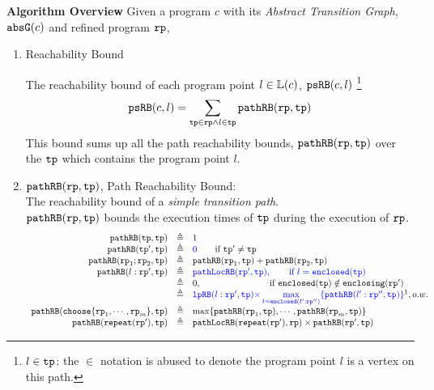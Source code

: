 \textbf{Algorithm Overview} 
Given a program $c$ with its \emph{Abstract Transition Graph}, $\mathtt{abs}{\mathtt{G}}(c)$ and refined program $\mathtt{rp}$,
\begin{enumerate}
    \item Reachability Bound
    
    The reachability bound of each program point $l \in \mathbb{L}(c)$, $\mathtt{psRB}(c, l)$
    \footnote{$l \in \mathtt{tp}$: the $\in$ notation is abused to denote
    the program point $l$ is a vertex on this path.}
   \[ 
     \mathtt{psRB}(c, l) = 
     \sum\limits_{\mathtt{tp} \in \mathtt{rp} \land 
   l \in \mathtt{tp}} 
   \mathtt{pathRB}(\mathtt{rp}, \mathtt{tp})
   \]
   This bound sums up all the path reachability bounds, $\mathtt{pathRB}(\mathtt{rp}, \mathtt{tp})$ over the $\mathtt{tp}$ which contains the program point $l$.
    \item $\mathtt{pathRB}(\mathtt{rp}, \mathtt{tp}) $, Path Reachability Bound:  
    \\
    The reachability bound of a \emph{simple transition path}.
    \\
    $\mathtt{pathRB}(\mathtt{rp}, \mathtt{tp}) $ bounds the execution times of $\mathtt{tp}$ during the execution of $\mathtt{rp}$.
%
    \[
      \begin{array}{rcl}
        \inoutB(\tpath, \tpath) & \triangleq & 1  \\
        \inoutB(\tpath', \tpath) & \triangleq & \highlight{0} \qquad \text{if } \tpath' \neq \tpath\\
        \inoutB(\rprog_1;\rprog_2, \tpath) & \triangleq & \inoutB(\rprog_1, \tpath) + \inoutB(\rprog_2, \tpath) \\
        \inoutB(l: \rprog', \tpath) & \triangleq & 
        \highlight{\outinB(\rprog', \tpath), \qquad \text{if } l = \kw{enclosed}(\tpath)}
        \\
        &  \triangleq & 
       0, \qquad \qquad \qquad \quad ~~ \text{if }  \kw{enclosed}(\tpath) \notin \kw{enclosing}(\rprog')
        \\
        &  \triangleq & 
        \highlight{
          \lpchB(l:\rprog', \tpath ) }
        \highlight{\times \max\limits_{l = \kw{enclosed}(l':\rprog'')}
       \{\inoutB(l':\rprog'', \tpath)\} } \footnotemark, o.w. \\
        \inoutB(\rpchoose{\rprog_1, \cdots, \rprog_m }, \tpath) & \triangleq 
        & \max\left\{ \inoutB(\rprog_1, \tpath), \cdots, \inoutB(\rprog_m, \tpath) \right\} 
        \\
        \inoutB(\rprepeat(\rprog'), \tpath) & \triangleq & \outinB(\rprepeat(\rprog'), \rprog) \times \inoutB(\rprog', \tpath)\\

\end{array}\]
\end{enumerate}
